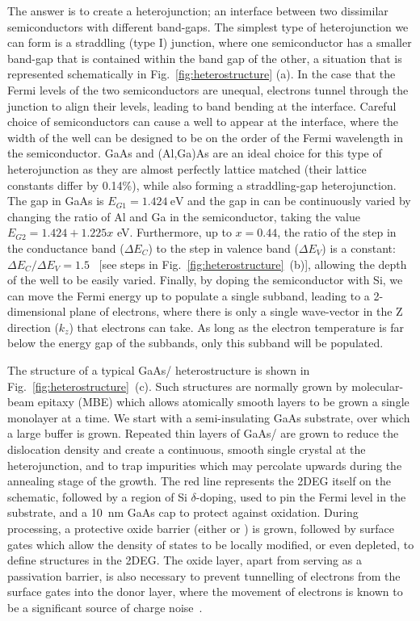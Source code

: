 The answer is to create a heterojunction; an interface between two dissimilar semiconductors with different band-gaps.
The simplest type of heterojunction we can form is a straddling (type I) junction, where one semiconductor has a smaller band-gap
that is contained within the band gap of the other, a situation that is represented schematically in Fig.~\ref{fig:heterostructure} (a).
In the case that the Fermi levels of the two semiconductors are unequal, electrons tunnel through the junction to align
their levels, leading to band bending at the interface. Careful choice of semiconductors can cause a well to appear at the interface,
where the width of the well can be designed to be on the order of the Fermi wavelength in the semiconductor. GaAs and (Al,Ga)As are
an ideal choice for this type of heterojunction as they are almost perfectly lattice matched (their lattice constants differ by 0.14\%),
while also forming a straddling-gap heterojunction. The gap in GaAs is $E_{G1} = \SI{1.424}{\electronvolt}$ and the gap in
 can be continuously varied by
changing the ratio of Al and Ga in the semiconductor, taking the value $E_{G2} = 1.424 + 1.225x$ \si{\electronvolt}.
Furthermore, up to $x = 0.44$, the ratio of the step in the conductance
band ($\Delta E_C$) to the step in valence band ($\Delta E_V$) is a constant: $\Delta E_C/\Delta E_V = 1.5$~\cite{adachi1993properties}
[see steps in Fig.~\ref{fig:heterostructure}~(b)], allowing the depth of the well to be easily varied.
Finally, by doping the semiconductor with Si, we can move the Fermi energy up to populate a single subband, leading to a
2-dimensional plane of electrons, where there is only a single wave-vector in the Z direction ($k_z$) that electrons can take. As long
as the electron temperature is far below the energy gap of the subbands, only this subband will be populated.

The structure of a typical GaAs/ heterostructure is shown in Fig.~\ref{fig:heterostructure}~(c). Such structures
are normally grown by molecular-beam epitaxy (MBE) which allows atomically smooth layers to be grown a single monolayer
at a time. We start with a semi-insulating GaAs substrate, over which a large buffer is grown.
Repeated thin layers of GaAs/ are grown to reduce the dislocation density
and create a continuous, smooth single crystal at the heterojunction, and to trap impurities which may percolate upwards
during the annealing stage of the growth. The red line represents the 2DEG itself on the schematic,
followed by a region of Si $\delta$-doping, used to pin the Fermi level in the substrate, and
a \SI{10}{\nano\meter} GaAs cap to protect against oxidation. During processing, a protective oxide barrier
(either  or ) is grown, followed by surface gates which allow the density of states to be locally modified, or even depleted,
to define structures in the 2DEG. The oxide layer, apart from serving as a passivation barrier, is also necessary to
prevent tunnelling of electrons from the surface gates into the donor layer, where the movement of electrons is known to be a significant
source of charge noise~\cite{PhysRevB.72.115331, PhysRevApplied.9.034008}.

